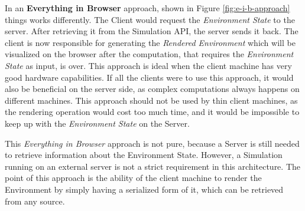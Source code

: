In an \textbf{Everything in Browser} approach, shown in Figure \ref{fig:e-i-b-approach} things works differently. The Client would request the \textit{Environment State} to the server. After retrieving it from the Simulation API, the server sends it back. The client is now responsible for generating the \textit{Rendered Environment} which will be visualized on the browser after the computation, that requires the \textit{Environment State} as input, is over. This approach is ideal when the client machine has very good hardware capabilities. If all the clients were to use this approach, it would also be beneficial on the server side, as complex computations always happens on different machines. This approach should not be used by thin client machines, as the rendering operation would cost too much time, and it would be impossible to keep up with the \textit{Environment State} on the Server.


\begin{warn}[Note:]
	This \textit{Everything in Browser} approach is not pure, because a Server is still needed to retrieve information about the Environment State. However, a Simulation running on an external server is not a strict requirement in this architecture. The point of this approach is the ability of the client machine to render the Environment by simply having a serialized form of it, which can be retrieved from any source.
\end{warn}
